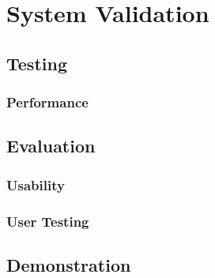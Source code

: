 \chapter{System Validation}

\section{Testing}
	\subsection{Performance}


\section{Evaluation}
	\subsection{Usability}
	\subsection{User Testing}

\section{Demonstration}
